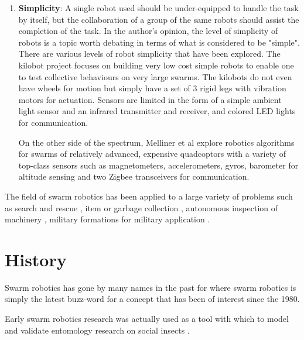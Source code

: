 \begin{enumerate}
\item \textbf{Simplicity}: A single robot used should be under-equipped to handle the task by itself, but the collaboration of a group of the same robots should assist the completion of the task. In the author's opinion, the level of simplicity of robots is a topic worth debating in terms of what is considered to be "simple". There are various levels of robot simplicity that have been explored. The kilobot project \cite{rubenstein2012kilobot} focuses on building very low cost simple robots to enable one to test collective behaviours on very large swarms. The kilobots do not even have wheels for motion but simply have a set of 3 rigid legs with vibration motors for actuation. Sensors are limited in the form of a simple ambient light sensor and an infrared transmitter and receiver, and colored LED lights for communication. 

On the other side of the spectrum, Melliner et al \cite{mellinger2013cooperative,kushleyev2013towards} explore robotics algorithms for swarms of relatively advanced, expensive quadcoptors with a variety of top-class sensors such as magnetometers, accelerometers, gyros, barometer for altitude sensing and two Zigbee transceivers for communication.
\end{enumerate}

 The field of swarm robotics has been applied to a large variety of problems such as search and rescue \cite{mondada2002search}, item or garbage collection \cite{balch1995io}, autonomous inspection of machinery \cite{correll2007challenging}, military formations for military application \cite{balch1998behavior}.



\section{History}
\label{history}
 
Swarm robotics has gone by many names in the past for where swarm robotics is simply the latest buzz-word for a concept that has been of interest since the 1980.

Early swarm robotics research was actually used as a tool with which to model and validate  entomology research on social insects \cite{dorigo2014swarm, beni1993swarm, seeley2009wisdom}.

